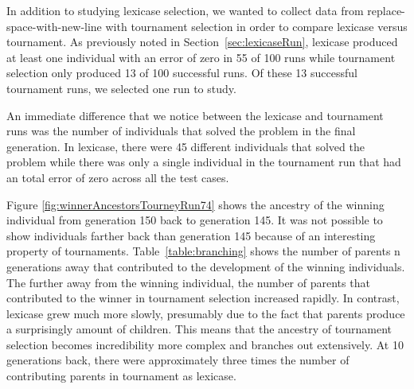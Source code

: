 In addition to studying lexicase selection, we wanted to collect data from replace-space-with-new-line 
with tournament selection in order to compare lexicase versus tournament. As previously noted in 
Section~\ref{sec:lexicaseRun}, lexicase  produced at least one individual with an error of zero in 
55 of 100 runs while tournament selection only produced 13 of 100 successful runs. Of these 13 
successful tournament runs, we selected one run to study.

An immediate difference that we notice between the lexicase and tournament runs was the number of 
individuals that solved the problem in the final generation. In lexicase, there were 45 different 
individuals that solved the problem while there was only a single individual in the tournament 
run that had an total error of zero across all the test cases.

Figure \ref{fig:winnerAncestorsTourneyRun74} shows the ancestry of the winning individual from 
generation 150 back to generation 145. It was not possible to show individuals farther back than 
generation 145 because of an interesting property of tournaments. Table~\ref{table:branching} shows 
the number of parents n generations away that contributed to the development of the winning individuals. 
The further away from the winning individual, the number of parents that contributed to the winner 
in tournament selection increased rapidly. In contrast, lexicase grew much more slowly, presumably 
due to the fact that parents produce a surprisingly amount of children. This means that the ancestry 
of tournament selection becomes incredibility more complex and branches out extensively. At 10 
generations back, there were approximately three times the number of contributing parents in 
tournament as lexicase. 

